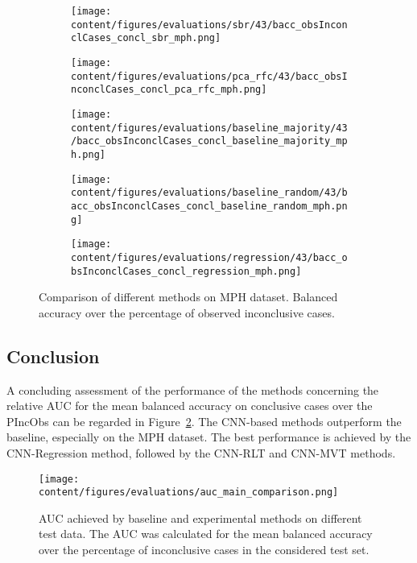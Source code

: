 \begin{figure}[ht]
  \begin{subfigure}{0.5\textwidth}
    \centering
    \texttt{[image: content/figures/evaluations/sbr/43/bacc\_obsInconclCases\_concl\_sbr\_mph.png]}
  \end{subfigure}
  \hfill
  \begin{subfigure}{0.5\textwidth}
    \centering
    \texttt{[image: content/figures/evaluations/pca\_rfc/43/bacc\_obsInconclCases\_concl\_pca\_rfc\_mph.png]}
  \end{subfigure}
  \hfill
  \begin{subfigure}{0.5\textwidth}
    \centering
    \texttt{[image: content/figures/evaluations/baseline\_majority/43/bacc\_obsInconclCases\_concl\_baseline\_majority\_mph.png]}
  \end{subfigure}
  \hfill
  \begin{subfigure}{0.5\textwidth}
    \centering
    \texttt{[image: content/figures/evaluations/baseline\_random/43/bacc\_obsInconclCases\_concl\_baseline\_random\_mph.png]}
  \end{subfigure}
  \hfill
  \begin{subfigure}{0.5\textwidth}
    \centering
    \texttt{[image: content/figures/evaluations/regression/43/bacc\_obsInconclCases\_concl\_regression\_mph.png]}
  \end{subfigure}

  \caption{Comparison of different methods on MPH dataset.
  Balanced accuracy over the percentage of observed inconclusive cases.}
  \label{fig:test_mph}
\end{figure}


\subsection{Conclusion}

A concluding assessment of the performance of the methods 
concerning the relative AUC for the mean balanced accuracy on conclusive cases over the PIncObs 
can be regarded in Figure~\ref{fig:auc_comparison_methods_data}.
The CNN-based methods outperform the baseline, especially on the MPH dataset.
The best performance is achieved by the CNN-Regression method, followed by the CNN-RLT and CNN-MVT methods.


\begin{figure}[ht]
  \centering
  \texttt{[image: content/figures/evaluations/auc\_main\_comparison.png]}
  \caption{AUC achieved by baseline and experimental methods on different test data. 
  The AUC was calculated for the mean balanced accuracy over the percentage of inconclusive cases 
  in the considered test set.} 
  \label{fig:auc_comparison_methods_data}
\end{figure} 